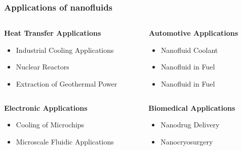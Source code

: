 \documentclass{beamer}
\begin{document}
\begin{frame}
\frametitle{Applications of nanofluids}

\begin{columns}[onlytextwidth,t]
    \begin{column}{0.48\textwidth}
        \textbf{Heat Transfer Applications}

    \begin{itemize}
        \item Industrial Cooling Applications
        \item Nuclear Reactors
        \item Extraction of Geothermal Power
    \end{itemize}
  \end{column}
  \begin{column}{0.48\textwidth}
    \textbf{Automotive Applications}

    \begin{itemize}
        \item Nanoﬂuid Coolant
        \item Nanoﬂuid in Fuel
        \item Nanoﬂuid in Fuel
    \end{itemize}
  \end{column}
\end{columns}

\bigskip
\begin{columns}[onlytextwidth,t]
 \begin{column}{0.48\textwidth}
    \textbf{Electronic Applications}

    \begin{itemize}
        \item Cooling of Microchips
        \item  Microscale Fluidic Applications    
    \end{itemize}
    \end{column}
  \begin{column}{0.48\textwidth}
    \textbf{Biomedical Applications}

    \begin{itemize}
        \item Nanodrug Delivery
        \item  Nanocryosurgery
    \end{itemize}
  \end{column}
\end{columns}
\end{frame}
\end{document}
